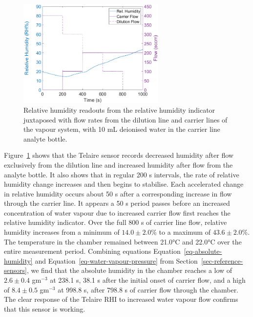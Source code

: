 \documentclass[
  a4paper,
]{scrbook}
\begin{document}
\begin{figure}

{\centering \includegraphics[width=0.65\textwidth,height=\textheight]{figures/ch5/RHI_verification.png}

}

\caption{\label{fig-RHI-verification}Relative humidity readouts from the
relative humidity indicator juxtaposed with flow rates from the dilution
line and carrier lines of the vapour system, with 10 mL deionised water
in the carrier line analyte bottle.}

\end{figure}

Figure~\ref{fig-RHI-verification} shows that the Telaire sensor records
decreased humidity after flow exclusively from the dilution line and
increased humidity after flow from the analyte bottle. It also shows
that in regular 200 s intervals, the rate of relative humidity change
increases and then begins to stabilise. Each accelerated change in
relative humidity occurs about 50 s after a corresponding increase in
flow through the carrier line. It appears a 50 s period passes before an
increased concentration of water vapour due to increased carrier flow
first reaches the relative humidity indicator. Over the full 800 s of
carrier line flow, relative humidity increases from a minimum of
\(14.0\pm2.0\)\% to a maximum of \(43.6\pm2.0\)\%. The temperature in
the chamber remained between 21.0°C and 22.0°C over the
entire measurement period. Combining equations
Equation~\ref{eq-absolute-humidity} and
Equation~\ref{eq-water-vapour-pressure} from
Section~\ref{sec-reference-sensors}, we find that the absolute humidity
in the chamber reaches a low of \(2.6\pm0.4\) gm\(^{-3}\) at 238.1 s,
38.1 s after the initial onset of carrier flow, and a high of
\(8.4\pm0.5\) gm\(^{-3}\) at 998.8 s, after 798.8 s of carrier flow
through the chamber. The clear response of the Telaire RHI to increased
water vapour flow confirms that this sensor is working.
\end{document}
